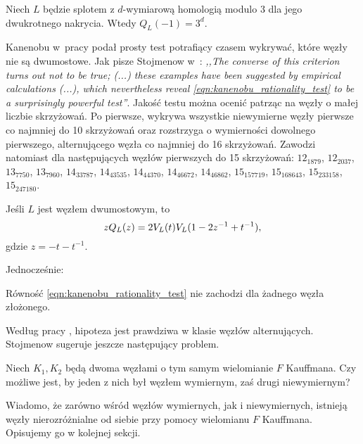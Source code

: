 \begin{proposition}
    Niech $L$ będzie splotem z $d$-wymiarową homologią modulo $3$ dla jego dwukrotnego nakrycia.
    Wtedy $Q_L(-1) = 3^d$.
\end{proposition}

Kanenobu w~pracy \cite{kanenobu89} podał prosty test potrafiący czasem wykrywać, które węzły nie są dwumostowe.
%
Jak pisze Stojmenow w~\cite{stoimenow00}: \emph{,,The converse of this criterion turns out not to be true; (...) these examples have been suggested by empirical calculations (...), which nevertheless reveal \ref{eqn:kanenobu_rationality_test} to be a surprisingly powerful test''}.
%
Jakość testu można ocenić patrząc na węzły o małej liczbie skrzyżowań.
Po pierwsze, wykrywa wszystkie niewymierne węzły pierwsze co najmniej do 10 skrzyżowań oraz rozstrzyga o wymierności dowolnego pierwszego, alternującego węzła co najmniej do 16 skrzyżowań.
Zawodzi natomiast dla następujących węzłów pierwszych do 15 skrzyżowań: $12_{1879}$, $12_{2037}$, $13_{7750}$, $13_{7960}$, $14_{33787}$, $14_{43535}$, $14_{44370}$, $14_{46672}$, $14_{46862}$, $15_{157719}$, $15_{168643}$, $15_{233158}$, $15_{247180}$.

\begin{proposition}
    Jeśli $L$ jest węzłem dwumostowym, to
    \begin{equation}
\label{eqn:kanenobu_rationality_test}%
        z Q_L(z) = 2 \jones_L(t) \jones_L (1-2z^{-1}+t^{-1}),
    \end{equation}
    gdzie $z = -t - t^{-1}$.
\end{proposition}

Jednocześnie:

\begin{conjecture}
    Równość \ref{eqn:kanenobu_rationality_test} nie zachodzi dla żadnego węzła złożonego.
%
\end{conjecture}

Według pracy \cite{stoimenow00}, hipoteza jest prawdziwa w klasie węzłów alternujących.
Stojmenow sugeruje jeszcze następujący problem.
%

\begin{conjecture}
    Niech $K_1, K_2$ będą dwoma węzłami o tym samym wielomianie $F$ Kauffmana.
    Czy możliwe jest, by jeden z nich był węzłem wymiernym, zaś drugi niewymiernym?
\end{conjecture}

Wiadomo, że zarówno wśród węzłów wymiernych, jak i niewymiernych, istnieją węzły nierozróżnialne od siebie przy pomocy wielomianu $F$ Kauffmana.
Opisujemy go w kolejnej sekcji.

%


